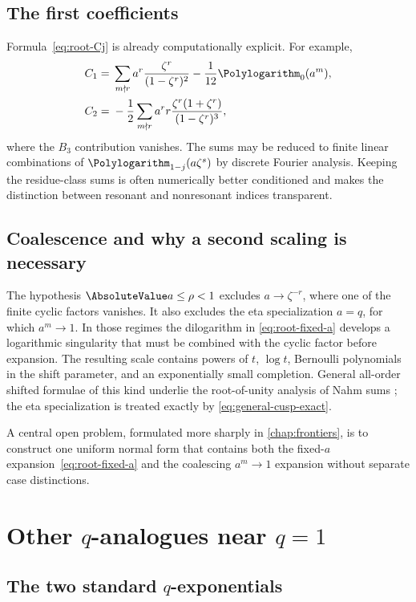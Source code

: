 \documentclass[11pt,oneside]{article}
\theoremstyle{definition}
\theoremstyle{remark}
\let\reporttopsection\section
\let\reportsubsection\subsection
\let\chapter\reporttopsection
\let\section\reportsubsection
\begin{document}
\section{The first coefficients}

Formula~\eqref{eq:root-Cj} is already computationally explicit.  For example,
\begin{align*}
 C_1={}&
 \sum_{m\nmid r}a^r\frac{\zeta^r}{(1-\zeta^r)^2}
 -\frac1{12}\Polylogarithm_0(a^m),\\
 C_2={}&-\frac12
 \sum_{m\nmid r}a^r r
 \frac{\zeta^r(1+\zeta^r)}{(1-\zeta^r)^3},
\end{align*}
where the $B_3$ contribution vanishes.  The sums may be reduced to finite
linear combinations of $\Polylogarithm_{1-j}(a\zeta^s)$ by discrete Fourier analysis.
Keeping the residue-class sums is often numerically better conditioned and
makes the distinction between resonant and nonresonant indices transparent.

\section{Coalescence and why a second scaling is necessary}

The hypothesis $\AbsoluteValue a\le\rho<1$ excludes $a\to\zeta^{-r}$, where one of the
finite cyclic factors vanishes.  It also excludes the eta specialization
$a=q$, for which $a^m\to1$.  In those regimes the dilogarithm in
\eqref{eq:root-fixed-a} develops a logarithmic singularity that must be combined
with the cyclic factor before expansion.  The resulting scale contains powers
of $t$, $\log t$, Bernoulli polynomials in the shift parameter, and an
exponentially small completion.  General all-order shifted formulae of this
kind underlie the root-of-unity analysis of Nahm sums
\cite{GaroufalidisZagier}; the eta specialization is treated exactly by
\eqref{eq:general-cusp-exact}.

A central open problem, formulated more sharply in
\cref{chap:frontiers}, is to construct one uniform normal form that contains
both the fixed-$a$ expansion~\eqref{eq:root-fixed-a} and the coalescing
$a^m\to1$ expansion without separate case distinctions.

\chapter{Other \texorpdfstring{$q$}{q}-analogues near \texorpdfstring{$q=1$}{q = 1}}\label{chap:other-q}

\section{The two standard \texorpdfstring{$q$}{q}-exponentials}
\end{document}
